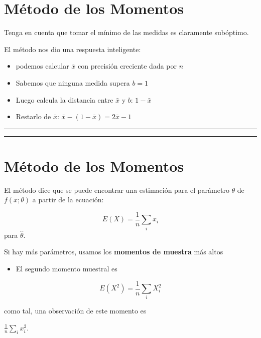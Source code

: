 \documentclass[
]{book}
\providecommand{\tightlist}{%
  \setlength{\itemsep}{0pt}\setlength{\parskip}{0pt}}
\begin{document}
\hypertarget{muxe9todo-de-los-momentos-5}{%
\section{Método de los Momentos}\label{muxe9todo-de-los-momentos-5}}

Tenga en cuenta que tomar el mínimo de las medidas es claramente subóptimo.

El método nos dio una respuesta inteligente:

\begin{itemize}
\tightlist
\item
  podemos calcular \(\bar{x}\) con precisión creciente dada por \(n\)
\item
  Sabemos que ninguna medida supera \(b=1\)
\item
  Luego calcula la distancia entre \(\bar{x}\) y \(b\): \(1-\bar{x}\)
\item
  Restarlo de \(\bar{x}\): \(\bar{x}-(1-\bar{x})=2\bar{x}-1\)
\end{itemize}

\begin{center}\rule{0.5\linewidth}{0.5pt}\end{center}

\begin{center}\rule{0.5\linewidth}{0.5pt}\end{center}

\hypertarget{muxe9todo-de-los-momentos-6}{%
\section{Método de los Momentos}\label{muxe9todo-de-los-momentos-6}}

El método dice que se puede encontrar una estimación para el parámetro \(\theta\) de \(f(x;\theta)\) a partir de la ecuación:

\[E(X)=\frac{1}{n}\sum_i x_i\]
para \(\hat{\theta}\).

Si hay más parámetros, usamos los \textbf{momentos de muestra} más altos

\begin{itemize}
\tightlist
\item
  El segundo momento muestral es
\end{itemize}

\[E(X^2)=\frac{1}{n}\sum_i X^2_i\]

como tal, una observación de este momento es

\(\frac{1}{n}\sum_i x^2_i\).
\end{document}
